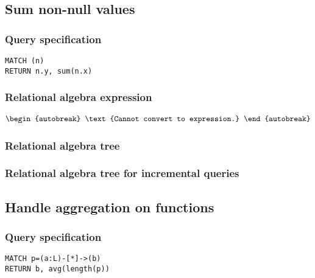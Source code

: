 \subsection{Sum non-null values}

\subsubsection*{Query specification}

\begin{lstlisting}
MATCH (n)
RETURN n.y, sum(n.x)
\end{lstlisting}

\subsubsection*{Relational algebra expression}

\begin{align*}
\begin{autobreak}
\text{Cannot convert to expression.}
\end{autobreak}
\end{align*}

\subsubsection*{Relational algebra tree}


\subsubsection*{Relational algebra tree for incremental queries}


\subsection{Handle aggregation on functions}

\subsubsection*{Query specification}

\begin{lstlisting}
MATCH p=(a:L)-[*]->(b)
RETURN b, avg(length(p))
\end{lstlisting}

